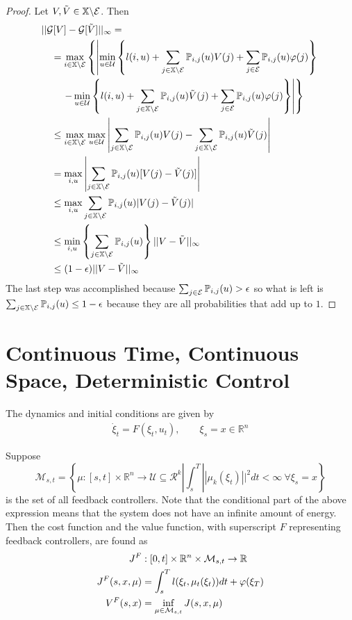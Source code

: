 \begin{proof}
Let $V,\tilde{V}\in\mathbb{X}\backslash\mathcal{E}$.
Then
\begin{align*}
&||\mathcal{G}[V]-\mathcal{G}[\tilde{V}]||_\infty = \\
&\quad = \max_{i\in\mathbb{X}\backslash\mathcal{E}}\left\lbrace \left| \min_{u\in\mathcal{U}}\left\lbrace l(i,u) + \sum_{j\in\mathbb{X}\backslash\mathcal{E}}\mathbb{P}_{i,j}(u)V(j) + \sum_{j\in\mathcal{E}}\mathbb{P}_{i,j}(u)\varphi(j)\right\rbrace \right.\right. \\
&\left.\left.\qquad - \min_{u\in\mathcal{U}}\left\lbrace l(i,u) + \sum_{j\in\mathbb{X}\backslash\mathcal{E}}\mathbb{P}_{i,j}(u)\tilde{V}(j) + \sum_{j\in\mathcal{E}}\mathbb{P}_{i,j}(u)\varphi(j) \right\rbrace\right|\right\rbrace \\
&\quad\leq \max_{i\in\mathbb{X}\backslash\mathcal{E}} \max_{u\in\mathcal{U}} \left|\sum_{j\in\mathbb{X}\backslash\mathcal{E}}\mathbb{P}_{i,j}(u)V(j) - \sum_{j\in\mathbb{X}\backslash\mathcal{E}}\mathbb{P}_{i,j}(u)\tilde{V}(j)\right| \\
&\quad= \max_{i,u} \left| \sum_{j\in\mathbb{X}\backslash\mathcal{E}}\mathbb{P}_{i,j}(u)[V(j)-\tilde{V}(j)]\right| \\
&\quad\leq \max_{i,u} \sum_{j\in\mathbb{X}\backslash\mathcal{E}}\mathbb{P}_{i,j}(u)|V(j)-\tilde{V}(j)| \\
&\quad\leq \min_{i,u} \left\lbrace \sum_{j\in\mathbb{X}\backslash\mathcal{E}}\mathbb{P}_{i,j}(u)\right\rbrace ||V-\tilde{V}||_\infty \\
&\quad\leq (1-\epsilon)||V-\tilde{V}||_\infty
\end{align*}
The last step was accomplished because $\sum_{j\in\mathcal{E}}\mathbb{P}_{i,j}(u)>\epsilon$ so what is left is $\sum_{j\in\mathbb{X}\backslash\mathcal{E}}\mathbb{P}_{i,j}(u)\leq1-\epsilon$ because they are all probabilities that add up to $1$.
\end{proof}

\section{Continuous Time, Continuous Space, Deterministic Control}
The dynamics and initial conditions are given by
\begin{align}
\label{eq:ctcsdynamics}
\dot{\xi}_t = F(\xi_t,u_t), \qquad \xi_s=x\in\mathbb{R}^n
\end{align}

Suppose
$$\mathcal{M}_{s,t} = \left\lbrace\mu:[s,t]\times\mathbb{R}^n\to\mathcal{U}\subseteq\mathcal{R}^k | \int_s^T||\mu_k(\xi_t)||^2dt<\infty~\forall \xi_s=x\right\rbrace$$
is the set of all feedback controllers.
Note that the conditional part of the above expression means that the system does not have an infinite amount of energy.
Then the cost function and the value function, with superscript $F$ representing feedback controllers, are found as
\begin{align*}
J^F&:[0,t]\times\mathbb{R}^n\times\mathcal{M}_{s,t}\to\mathbb{R} \\
J^F(s,x,\mu) &= \int_s^T l(\xi_t,\mu_t(\xi_t))dt + \varphi(\xi_T) \\
V^F(s,x) &= \inf_{\mu\in\mathcal{M}_{s,t}} J(s,x,\mu)
\end{align*}

